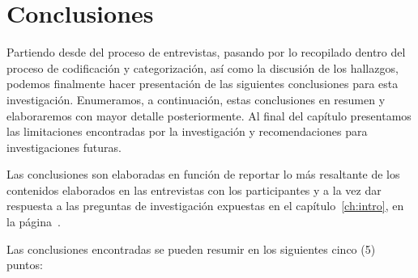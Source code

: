 \chapter{Conclusiones}\label{ch:conclusion}
%
%
%
%
%
%
%
%
%
%

Partiendo desde del proceso de entrevistas, pasando por lo recopilado dentro del
proceso de codificación y categorización, así como la discusión de los hallazgos,
podemos finalmente hacer presentación de las siguientes conclusiones para esta
investigación. Enumeramos, a continuación, estas conclusiones en resumen y
elaboraremos con mayor detalle posteriormente. Al final del capítulo presentamos
las limitaciones encontradas por la investigación y recomendaciones para
investigaciones futuras.

Las conclusiones son elaboradas en función de reportar lo más resaltante de los
contenidos elaborados en las entrevistas con los participantes y a la vez dar
respuesta a las preguntas de investigación expuestas en el
capítulo~\ref{ch:intro}, en la página~\pageref{preguntas}.

Las conclusiones encontradas se pueden resumir en los siguientes cinco (5)
puntos:

